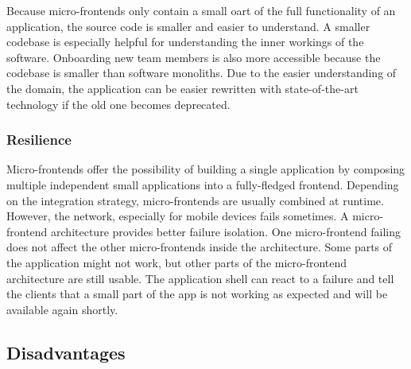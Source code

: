 Because micro-frontends only contain a small oart of the full functionality of an application, the source code is smaller and easier to understand. A smaller codebase is especially helpful for understanding the inner workings of the software. Onboarding new team members is also more accessible because the codebase is smaller than software monoliths. Due to the easier understanding of the domain, the application can be easier rewritten with state-of-the-art technology if the old one becomes deprecated. \cite{book:2020:geers:background:micro-frontends:micro-frontends-in-action}

\subsubsection{Resilience}\label{subsubsection:background:micro-frontend-resilience}

Micro-frontends offer the possibility of building a single application by composing multiple independent small applications into a fully-fledged frontend. Depending on the integration strategy, micro-frontends are usually combined at runtime. However, the network, especially for mobile devices fails sometimes. A micro-frontend architecture provides better failure isolation. One micro-frontend failing does not affect the other micro-frontends inside the architecture. Some parts of the application might not work, but other parts of the micro-frontend architecture are still usable. The application shell can react to a failure and tell the clients that a small part of the app is not working as expected and will be available again shortly. \cite[10-11]{article:2021:perltonen:background:micro-frontends:motivations-benefits-and-issues}

\subsection{Disadvantages}\label{subsection:background:micro-frontend-downsides}

